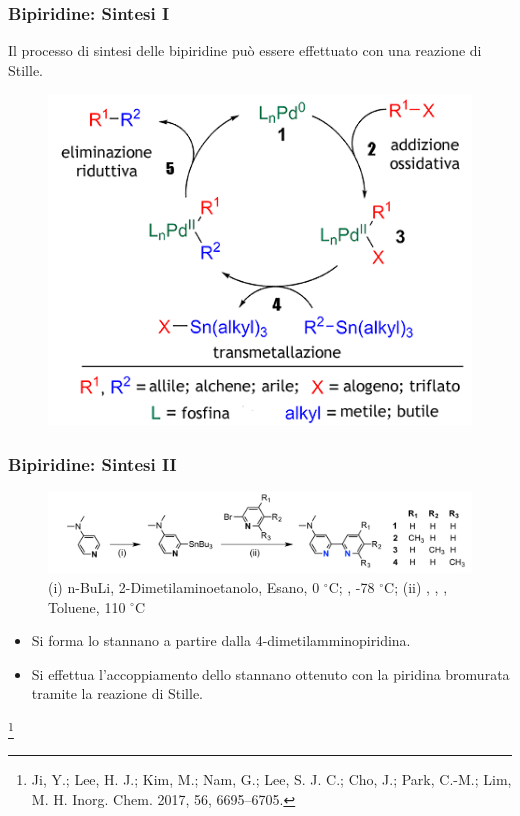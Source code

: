 \documentclass[9pt]{beamer}
\newcommand\blfootnote[1]{%
	\begingroup
	\renewcommand\thefootnote{}\footnote{#1}%
	\addtocounter{footnote}{-1}%
	\endgroup
}
\begin{document}
\begin{frame}
	\frametitle{Bipiridine: Sintesi I}
	Il processo di sintesi delle bipiridine può essere effettuato con una reazione di Stille.
	
	\begin{figure}
		\includegraphics[scale=0.7]{immagini/stille.png}
	\end{figure}
	
\end{frame}

\begin{frame}
	\frametitle{Bipiridine: Sintesi II}
	\begin{figure}
		\includegraphics[width=\textwidth]{immagini/rea_g.png}
		{\caption*{\footnotesize{(i) n-BuLi, 2-Dimetilaminoetanolo, Esano, 0 $^\circ$C; , -78 $^\circ$C; (ii) , , , Toluene, 110 $^\circ$C}}}
	\end{figure}
	\begin{itemize}
		\item Si forma lo stannano a partire dalla 4-dimetilamminopiridina.
		\item Si effettua l'accoppiamento dello stannano ottenuto con la piridina bromurata tramite la reazione di Stille.
	\end{itemize}
	
	\blfootnote{Ji, Y.; Lee, H. J.; Kim, M.; Nam, G.; Lee, S. J. C.; Cho, J.; Park, C.-M.; Lim, M. H. Inorg. Chem. 2017,
		56, 6695–6705.}
\end{frame}
\end{document}

